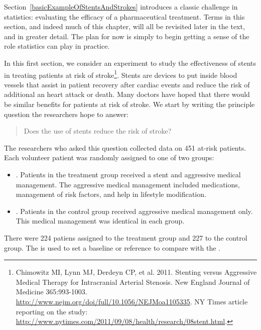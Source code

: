 

Section~\ref{basicExampleOfStentsAndStrokes} introduces a classic challenge in statistics: evaluating the efficacy of a pharmaceutical treatment. Terms in this section, and indeed much of this chapter, will all be revisited later in the text, and in greater detail. The plan for now is simply to begin getting a sense of the role statistics can play in practice.

In this first section, we consider an experiment to study the effectiveness of stents in treating patients at risk of stroke\footnote{Chimowitz MI, Lynn MJ, Derdeyn CP, et al. 2011. Stenting versus Aggressive Medical Therapy for Intracranial Arterial Stenosis. New England Journal of Medicine 365:993-1003. \url{http://www.nejm.org/doi/full/10.1056/NEJMoa1105335}. NY Times article reporting on the study: \url{http://www.nytimes.com/2011/09/08/health/research/08stent.html}.}.
Stents are devices to put inside blood vessels that assist in patient recovery after cardiac events and reduce the risk of additional an heart attack or death. Many doctors have hoped that there would be similar benefits for patients at risk of stroke. We start by writing the principle question the researchers hope to answer:
\begin{quote}
Does the use of stents reduce the risk of stroke?
\end{quote}

The researchers who asked this question collected data on 451 at-risk patients. Each volunteer patient was randomly assigned to one of two groups:
\begin{itemize}
\item[]. Patients in the treatment group received a stent and aggressive medical management. The aggressive medical management included medications, management of risk factors, and help in lifestyle modification.
\item[]. Patients in the control group received aggressive medical management only. This medical management was identical in each group.
\end{itemize}
There were 224 patiens assigned to the treatment group and 227 to the control group. The  is used to set a baseline or reference to compare with the .

